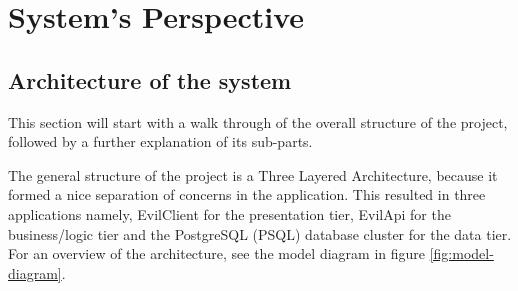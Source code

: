 \documentclass[report/main.tex]{subfiles}
\begin{document}
    \section{System's Perspective}
    \label{Sec:systems_perspective}
    
        \subsection{Architecture of the system}
        \label{subsec:architecture_of_system}
            
            
            This section will start with a walk through of the overall structure of the project, followed by a further explanation of its sub-parts.
            
            The general structure of the project is a Three Layered Architecture, because it formed a nice separation of concerns in the application. This resulted in three applications namely, EvilClient for the presentation tier, EvilApi for the business/logic tier and the PostgreSQL (PSQL) database cluster for the data tier. For an overview of the architecture, see the model diagram in figure \ref{fig:model-diagram}.
            
\end{document}
